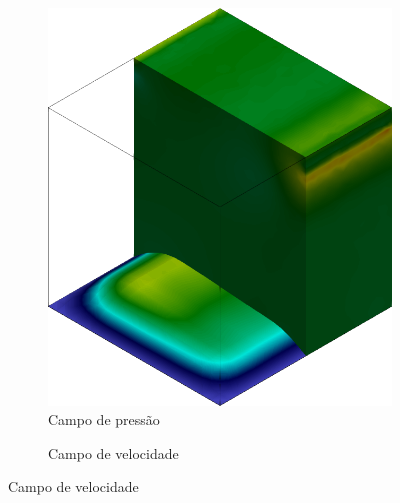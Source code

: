 \begin{figure}[h!]
    \centering
    \caption{Cavidade tridimensional - Campo de pressão e de velocidade na cavidade.}
    \begin{subfigure}[b]{0.23\textwidth}
        \caption*{Campo de pressão}
        \includegraphics[width=\linewidth]{Figuras/FSI-Cavity3D/p4.png}
    \end{subfigure}
    \begin{subfigure}[b]{0.23\textwidth}
        \caption*{Campo de velocidade}

\end{subfigure}
\end{figure}
